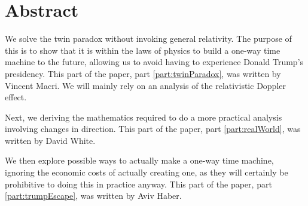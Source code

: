 \chapter*{Abstract}
	We solve the twin paradox without invoking general relativity.
	The purpose of this is to show that it is within the laws of physics to build a one-way time machine to the future, allowing us to avoid having to experience Donald Trump's presidency. This part of the paper, part \ref{part:twinParadox}, was written by Vincent Macri.
	We will mainly rely on an analysis of the relativistic Doppler effect.

	Next, we deriving the mathematics required to do a more practical analysis involving changes in direction. This part of the paper, part \ref{part:realWorld}, was written by David White.

	We then explore possible ways to actually make a one-way time machine, ignoring the economic costs of actually creating one, as they will certainly be prohibitive to doing this in practice anyway. This part of the paper, part \ref{part:trumpEscape}, was written by Aviv Haber.
